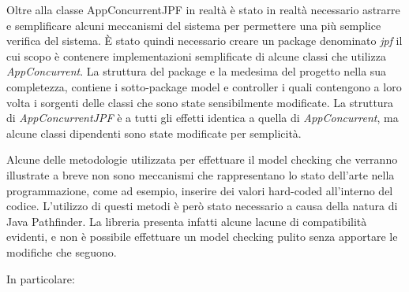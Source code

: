 Oltre alla classe AppConcurrentJPF in realtà è stato in realtà necessario astrarre e semplificare alcuni meccanismi del sistema per permettere una più semplice verifica del sistema.\newline
È stato quindi necessario creare un package denominato \textit{jpf} il cui scopo è contenere implementazioni semplificate di alcune classi che utilizza \textit{AppConcurrent}. La struttura del package e la medesima del progetto nella sua completezza, contiene i sotto-package model e controller i quali contengono a loro volta i sorgenti delle classi che sono state sensibilmente modificate.\newline
La struttura di \textit{AppConcurrentJPF} è a tutti gli effetti identica a quella di \textit{AppConcurrent}, ma alcune classi dipendenti sono state modificate per semplicità.
\begin{warn}[ATTENZIONE:]
Alcune delle metodologie utilizzata per effettuare il model checking che verranno illustrate a breve non sono meccanismi che rappresentano lo stato dell'arte nella programmazione, come ad esempio, inserire dei valori hard-coded all'interno del codice.\newline
L'utilizzo di questi metodi è però stato necessario a causa della natura di Java Pathfinder. La libreria presenta infatti alcune lacune di compatibilità evidenti, e non è possibile effettuare un model checking pulito senza apportare le modifiche che seguono.
\end{warn}
In particolare:
